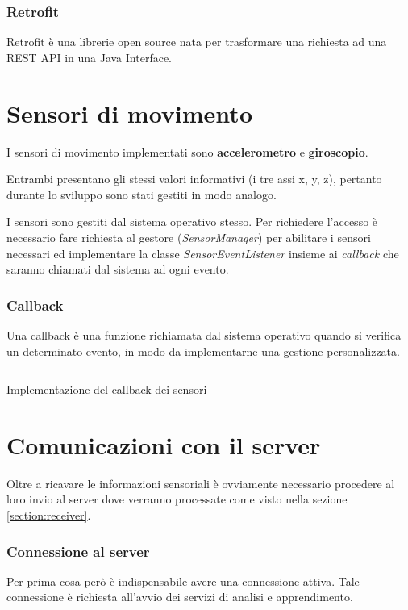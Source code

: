 \subsubsection{Retrofit}
Retrofit \cite{retrofit} è una librerie open source nata per trasformare una richiesta ad una REST API 
in una Java Interface.


\newpage
\section{Sensori di movimento}
I sensori di movimento implementati sono \textbf{accelerometro} e \textbf{giroscopio}.

Entrambi presentano gli stessi valori informativi (i tre assi x, y, z), pertanto durante lo sviluppo sono stati gestiti in modo analogo.

I sensori sono gestiti dal sistema operativo stesso. Per richiedere l'accesso è necessario fare richiesta al gestore (\textit{SensorManager}) 
per abilitare i sensori necessari ed implementare la classe \textit{SensorEventListener} \cite{sensor}
insieme ai \textit{callback} che saranno chiamati dal sistema ad ogni evento.
\subsubsection{Callback}
Una callback è una funzione richiamata dal sistema operativo quando si verifica un determinato evento, in modo da implementarne 
una gestione personalizzata.

\begin{listing}[H] 
    \inputminted[frame=single,framesep=10pt]{java}{snippets/app/sensors.java}
    \caption{Implementazione del callback dei sensori}
    \label{listing:sensor-event-callback}
\end{listing}



\newpage
\section{Comunicazioni con il server}
Oltre a ricavare le informazioni sensoriali è ovviamente necessario procedere al loro invio al server  
dove verranno processate come visto nella sezione \ref{section:receiver}.
\subsubsection{Connessione al server}
Per prima cosa però è indispensabile avere una connessione attiva. Tale connessione è richiesta all'avvio dei servizi di 
analisi e apprendimento.

